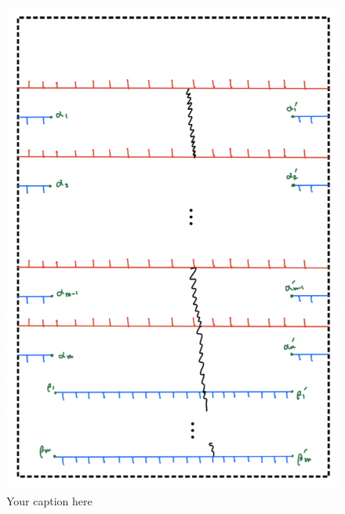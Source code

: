 \begin{figure}[H] %
    \centering
    \includegraphics[width=\linewidth]{diagrams/lemma7/6.png} %
    \caption{Your caption here}
    \label{fig:your-label}
\end{figure}